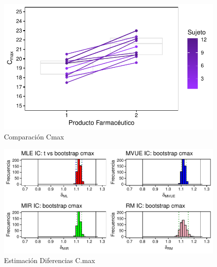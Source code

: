 \documentclass[]{article}
\begin{document}
\begin{figure}[H]

{\centering \includegraphics{parcial_1_files/figure-latex/unnamed-chunk-36-1} 

}

\caption{Comparación Cmax}\label{fig:unnamed-chunk-36}
\end{figure}

\begin{figure}[H]

{\centering \includegraphics{parcial_1_files/figure-latex/unnamed-chunk-37-1} 

}

\caption{Estimación Diferencias C.max}\label{fig:unnamed-chunk-37}
\end{figure}
\end{document}
